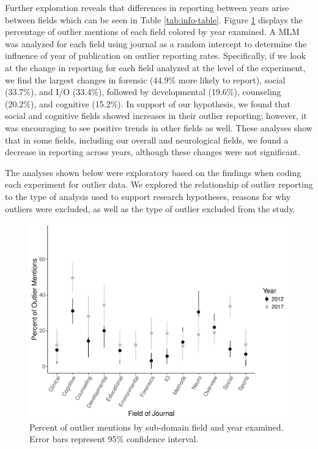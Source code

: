 \documentclass[english,man]{apa6}
\theoremstyle{definition}
\theoremstyle{definition}
\theoremstyle{definition}
\theoremstyle{remark}
\begin{document}
Further exploration reveals that differences in reporting between years
arise between fields which can be seen in Table \ref{tab:info-table}.
Figure \ref{fig:type-graph} displays the percentage of outlier mentions
of each field colored by year examined. A MLM was analyzed for each
field using journal as a random intercept to determine the influence of
year of publication on outlier reporting rates. Specifically, if we look
at the change in reporting for each field analyzed at the level of the
experiment, we find the largest changes in forensic (44.9\% more likely
to report), social (33.7\%), and I/O (33.4\%), followed by developmental
(19.6\%), counseling (20.2\%), and cognitive (15.2\%). In support of our
hypothesis, we found that social and cognitive fields showed increases
in their outlier reporting; however, it was encouraging to see positive
trends in other fields as well. These analyses show that in some fields,
including our overall and neurological fields, we found a decrease in
reporting across years, although these changes were not significant.

The analyses shown below were exploratory based on the findings when
coding each experiment for outlier data. We explored the relationship of
outlier reporting to the type of analysis used to support research
hypotheses, reasons for why outliers were excluded, as well as the type
of outlier excluded from the study.

\begin{figure}
\centering
\includegraphics{outliers_manuscript_files/figure-latex/type-graph-1.pdf}
\caption{\label{fig:type-graph}Percent of outlier mentions by sub-domain
field and year examined. Error bars represent 95\% confidence interval.}
\end{figure}
\end{document}
